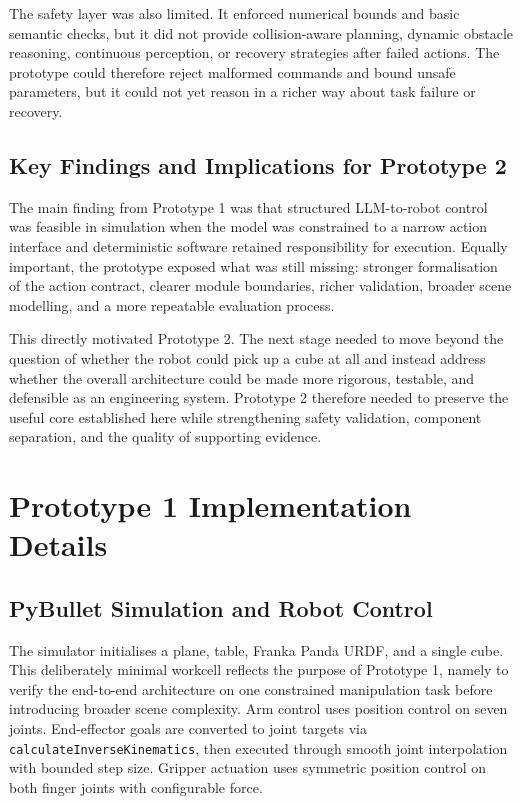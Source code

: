 \documentclass[12pt,a4paper]{article}
\begin{document}
The safety layer was also limited. It enforced numerical bounds and basic semantic checks, but it did not provide collision-aware planning, dynamic obstacle reasoning, continuous perception, or recovery strategies after failed actions. The prototype could therefore reject malformed commands and bound unsafe parameters, but it could not yet reason in a richer way about task failure or recovery.

\subsection{Key Findings and Implications for Prototype 2}

The main finding from Prototype 1 was that structured LLM-to-robot control was feasible in simulation when the model was constrained to a narrow action interface and deterministic software retained responsibility for execution. Equally important, the prototype exposed what was still missing: stronger formalisation of the action contract, clearer module boundaries, richer validation, broader scene modelling, and a more repeatable evaluation process.

This directly motivated Prototype 2. The next stage needed to move beyond the question of whether the robot could pick up a cube at all and instead address whether the overall architecture could be made more rigorous, testable, and defensible as an engineering system. Prototype 2 therefore needed to preserve the useful core established here while strengthening safety validation, component separation, and the quality of supporting evidence.

\section{Prototype 1 Implementation Details}

\subsection{PyBullet Simulation and Robot Control}

The simulator initialises a plane, table, Franka Panda URDF, and a single cube. This deliberately minimal workcell reflects the purpose of Prototype 1, namely to verify the end-to-end architecture on one constrained manipulation task before introducing broader scene complexity. Arm control uses position control on seven joints. End-effector goals are converted to joint targets via \texttt{calculateInverseKinematics}, then executed through smooth joint interpolation with bounded step size. Gripper actuation uses symmetric position control on both finger joints with configurable force.
\end{document}
